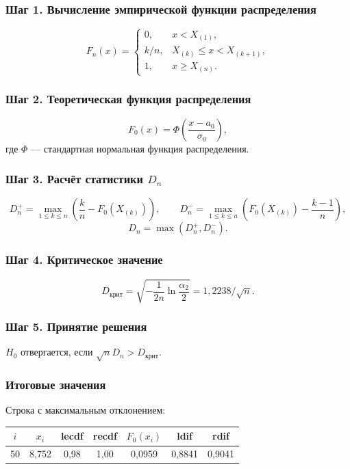 \documentclass[12pt,a4paper]{article}
\begin{document}
	\subsubsection*{Шаг 1. Вычисление эмпирической функции распределения}
	
	\[
	F_n(x) = \begin{cases}
		0, & x < X_{(1)},\\
		k/n, & X_{(k)} \le x < X_{(k+1)},\\
		1, & x \ge X_{(n)}.
	\end{cases}
	\]
	
	\subsubsection*{Шаг 2. Теоретическая функция распределения}
	
	\[
	F_0(x) = \Phi\!\left(\frac{x-a_0}{\sigma_0}\right),
	\]
	где $\Phi$ --- стандартная нормальная функция распределения.
	
	\subsubsection*{Шаг 3. Расчёт статистики $D_n$}
	
	\[
	D_n^+ = \max_{1\le k\le n}\!\left(\frac{k}{n} - F_0(X_{(k)})\right),\qquad
	D_n^- = \max_{1\le k\le n}\!\left(F_0(X_{(k)}) - \frac{k-1}{n}\right),
	\]
	\[
	D_n = \max(D_n^+, D_n^-).
	\]
	
	\subsubsection*{Шаг 4. Критическое значение}
	
	\[
	D_{\text{крит}} = \sqrt{-\frac{1}{2n}\ln\frac{\alpha_2}{2}} = 1{,}2238/\sqrt{n}.
	\]
	
	\subsubsection*{Шаг 5. Принятие решения}
	
	$H_0$ отвергается, если $\sqrt{n}D_n > D_{\text{крит}}$.
	
	\subsubsection*{Итоговые значения}
	
	Строка с максимальным отклонением:
	\begin{center}
		\begin{tabular}{ccccccc}
			\toprule
			$i$ & $x_i$ & lecdf & recdf & $F_0(x_i)$ & ldif & rdif \\
			\midrule
			50 & 8{,}752 & 0{,}98 & 1{,}00 & 0{,}0959 & 0{,}8841 & 0{,}9041 \\
			\bottomrule
		\end{tabular}
	\end{center}
	
\end{document}
